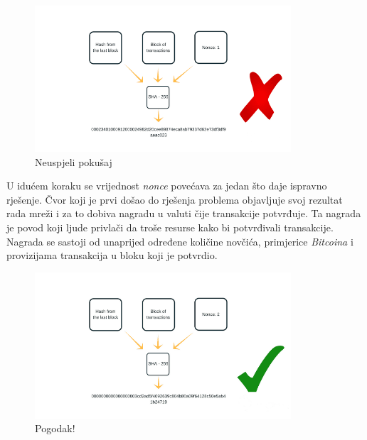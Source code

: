 \documentclass[times, utf8, zavrsni, numeric]{fer}
\begin{document}
\begin{figure}[ht]
  \centering
  \includegraphics[width=0.85\textwidth]{proof-of-work-wrong-result-2.png}
  \caption{Neuspjeli pokušaj}
\end{figure}
\pagebreak
U idućem koraku se vrijednost \emph{nonce} povećava za jedan što daje ispravno rješenje. Čvor koji je prvi došao do rješenja problema objavljuje svoj rezultat rada mreži
i za to dobiva nagradu u valuti čije transakcije potvrđuje. Ta nagrada je povod koji ljude privlači da troše resurse kako bi potvrđivali transakcije. Nagrada se sastoji
od unaprijed određene količine novčića, primjerice \emph{Bitcoina} i provizijama transakcija u bloku koji je potvrdio. 

\begin{figure}[ht]
  \centering
  \includegraphics[width=0.85\textwidth]{proof-of-work-right-result-2.png}
  \caption{Pogodak!}
\end{figure}
\end{document}
